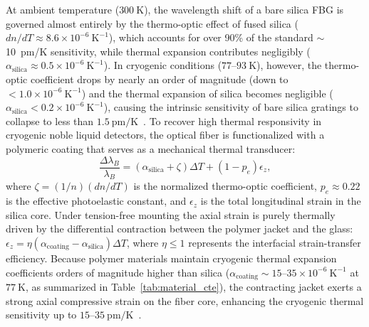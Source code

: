 \documentclass[12pt]{article}
\begin{document}
At ambient temperature ($300~\text{K}$), the wavelength shift of a bare silica FBG is governed almost entirely by the thermo-optic effect of fused silica ($dn/dT \approx 8.6 \times 10^{-6}~\text{K}^{-1}$), which accounts for over 90\% of the standard $\sim$10~pm/K sensitivity, while thermal expansion contributes negligibly ($\alpha_{\text{silica}} \approx 0.5 \times 10^{-6}~\text{K}^{-1}$). In cryogenic conditions ($77$--$93~\text{K}$), however, the thermo-optic coefficient drops by nearly an order of magnitude (down to $<1.0 \times 10^{-6}~\text{K}^{-1}$) and the thermal expansion of silica becomes negligible ($\alpha_{\text{silica}} < 0.2 \times 10^{-6}~\text{K}^{-1}$), causing the intrinsic sensitivity of bare silica gratings to collapse to less than $1.5~\text{pm/K}$~\cite{Lupi2008,Salin2008,Rajan2013}. To recover high thermal responsivity in cryogenic noble liquid detectors, the optical fiber is functionalized with a polymeric coating that serves as a mechanical thermal transducer:
\begin{equation}
    \frac{\Delta \lambda_B}{\lambda_B} = (\alpha_{\text{silica}} + \zeta) \Delta T + (1 - p_e) \epsilon_z,
    \label{eq:fbg_coating_strain}
\end{equation}
where $\zeta = (1/n)(dn/dT)$ is the normalized thermo-optic coefficient, $p_e \approx 0.22$ is the effective photoelastic constant, and $\epsilon_z$ is the total longitudinal strain in the silica core. Under tension-free mounting 
the axial strain is purely thermally driven by the differential contraction between the polymer jacket and the glass: $\epsilon_z = \eta (\alpha_{\text{coating}} - \alpha_{\text{silica}}) \Delta T$, where $\eta \le 1$ represents the interfacial strain-transfer efficiency. Because polymer materials maintain cryogenic thermal expansion coefficients orders of magnitude higher than silica ($\alpha_{\text{coating}} \sim 15$--$35 \times 10^{-6}~\text{K}^{-1}$ at $77~\text{K}$, as summarized in Table~\ref{tab:material_cte}), the contracting jacket exerts a strong axial compressive strain on the fiber core, enhancing the cryogenic thermal sensitivity up to $15$--$35~\text{pm/K}$~\cite{Lupi2008,Zhao2007,Rajan2013}.
\end{document}
